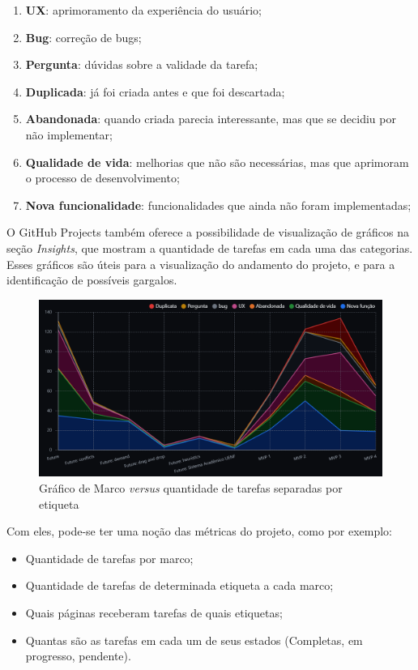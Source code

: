 \begin{enumerate}
  \item \textbf{UX}: aprimoramento da experiência do usuário;
  \item \textbf{Bug}: correção de bugs;
  \item \textbf{Pergunta}: dúvidas sobre a validade da tarefa;
  \item \textbf{Duplicada}: já foi criada antes e que foi descartada;
  \item \textbf{Abandonada}: quando criada parecia interessante, mas que se decidiu por não implementar;
  \item \textbf{Qualidade de vida}: melhorias que não são necessárias, mas que aprimoram o processo de desenvolvimento;
  \item \textbf{Nova funcionalidade}: funcionalidades que ainda não foram implementadas;
\end{enumerate}


O GitHub Projects também oferece a possibilidade de visualização de gráficos na seção \textit{Insights}, que mostram a quantidade de tarefas em cada uma das categorias. Esses gráficos são úteis para a visualização do andamento do projeto, e para a identificação de possíveis gargalos.

\begin{figure}[htbp]
  \centering
  \caption{Gráfico de Marco \textit{versus} quantidade de tarefas separadas por etiqueta\label{fig:ProjectsInsights}}
  \includegraphics[scale=0.6]{files/img/Codificacao/GitHubProjects - Insights - Stacked Line Milestone_Label.png}
  \legend{\selfAuthor}
\end{figure}

Com eles, pode-se ter uma noção das métricas do projeto, como por exemplo:

\begin{itemize}
  \item Quantidade de tarefas por marco;
  \item Quantidade de tarefas de determinada etiqueta a cada marco;
  \item Quais páginas receberam tarefas de quais etiquetas;
  \item Quantas são as tarefas em cada um de seus estados (Completas, em progresso, pendente).
\end{itemize}

